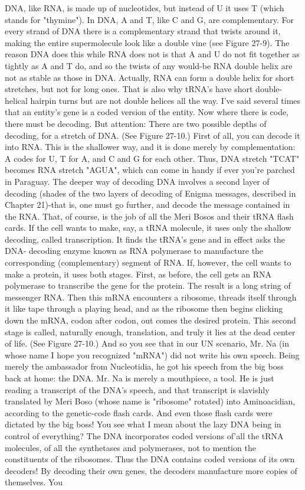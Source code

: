          DNA, like RNA, is made up of nucleotides, but instead of U it uses T (which
stands for "thymine"). In DNA, A and T, like C and G, are complementary. For every
strand of DNA there is a complementary strand that twists around it, making the
entire supermolecule look like a double vine (see Figure 27-9). The reason DNA does
this while RNA does not is that A and U do not fit together as tightly as A and T do,
and so the twists of any would-be RNA double helix are not as stable as those in
DNA. Actually, RNA can form a double helix for short stretches, but not for long
ones. That is also why tRNA's have short double-helical hairpin turns but are not
double helices all the way.
         I've said several times that an entity's gene is a coded version of the entity.
Now where there is code, there must be decoding. But attention: There are two
possible depths of decoding, for a stretch of DNA. (See Figure 27-10.) First of all,
you can decode it into RNA. This is the shallower way, and it is done merely by
complementation: A codes for U, T for A, and C and G for each other. Thus, DNA
stretch "TCAT" becomes RNA stretch "AGUA", which can come in handy if ever
you're parched in Paraguay. The deeper way of decoding DNA involves a second
layer of decoding (shades of the two layers of decoding of Enigma messages,
described in Chapter 21)-that is, one must go further, and decode the message
contained in the RNA. That, of course, is the job of all the Meri Bosos and their tRNA
flash cards.
         If the cell wants to make, say, a tRNA molecule, it uses only the shallow
decoding, called transcription. It finds the tRNA's gene and in effect asks the DNA-
decoding enzyme known as RNA polymerase to manufacture the corresponding
(complementary) segment of RNA. If, however, the cell wants to make a protein, it
uses both stages. First, as before, the cell gets an RNA polymerase to transcribe the
gene for the protein. The result is a long string of messenger RNA. Then this mRNA
encounters a ribosome, threads itself through it like tape through a playing head, and
as the ribosome then begins clicking down the mRNA, codon after codon, out comes
the desired protein. This second stage is called, naturally enough, translation, and
truly it lies at the dead center of life. (See Figure 27-10.)
         And so you see that in our UN scenario, Mr. Na (in whose name I hope you
recognized "mRNA") did not write his own speech. Being merely the ambassador
from Nucleotidia, he got his speech from the big boss back at home: the DNA. Mr. Na
is merely a mouthpiece, a tool. He is just reading a transcript of the DNA's speech,
and that transcript is slavishly translated by Meri Boso (whose name is "ribosome"
rotated) into Aminoacidian, according to the genetic-code flash cards. And even those
flash cards were dictated by the big boss! You see what I mean about the lazy DNA
being in control of everything?
         The DNA incorporates coded versions of'all the tRNA molecules, of all the
synthetases and polymerases, not to mention the constituents of the ribosomes. Thus
the DNA contains coded versions of its own decoders! By decoding their own genes,
the decoders manufacture more copies of themselves. You




